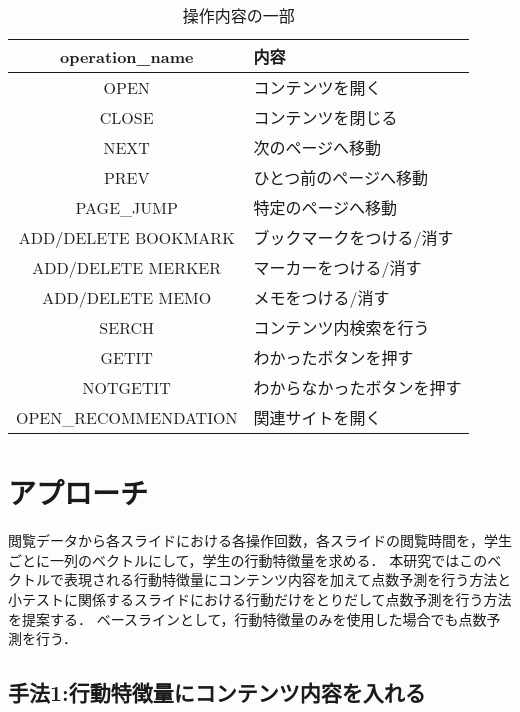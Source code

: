 \documentclass[a4j]{jarticle}
\begin{document}
\begin{table*}[h]
  \centering
  \begin{tabular}{c|l}
    operation\_name & 内容 \\ \hline
    OPEN & コンテンツを開く \\ 
    CLOSE & コンテンツを閉じる \\ 
    NEXT & 次のページへ移動 \\
    PREV & ひとつ前のページへ移動 \\ 
    PAGE\_JUMP & 特定のページへ移動 \\ 
    ADD/DELETE BOOKMARK & ブックマークをつける/消す \\
    ADD/DELETE MERKER & マーカーをつける/消す \\
    ADD/DELETE MEMO & メモをつける/消す \\
    SERCH & コンテンツ内検索を行う \\
    GETIT & わかったボタンを押す \\ 
    NOTGETIT & わからなかったボタンを押す \\
    OPEN\_RECOMMENDATION & 関連サイトを開く \\ \hline
  \end{tabular}
  \caption{操作内容の一部}
  \label{tb:操作内容の一部}
\end{table*}



\section{アプローチ}

閲覧データから各スライドにおける各操作回数，各スライドの閲覧時間を，学生ごとに一列のベクトルにして，学生の行動特徴量を求める．
本研究ではこのベクトルで表現される行動特徴量にコンテンツ内容を加えて点数予測を行う方法と小テストに関係するスライドにおける行動だけをとりだして点数予測を行う方法を提案する．
ベースラインとして，行動特徴量のみを使用した場合でも点数予測を行う．

\subsection{手法1:行動特徴量にコンテンツ内容を入れる}
\end{document}
